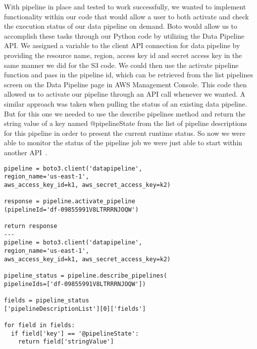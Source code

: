 With pipeline in place and tested to work successfully, we wanted to implement 
functionality within our code that would allow a user to both activate and 
check the execution status of our data pipeline on demand.  Boto would allow 
us to accomplish these tasks through our Python code by utilizing the Data 
Pipeline API. We assigned a variable to the client API connection for data 
pipeline by providing the resource name, region, access key id and secret 
access key in the same manner we did for the S3 code. We could then use the 
activate pipeline function and pass in the pipeline id, which can be retrieved 
from the list pipelines screen on the Data Pipeline page in AWS Management 
Console. This code then allowed us to activate our pipeline through an API 
call whenever we wanted. A similar approach was taken when pulling the status 
of an existing data pipeline. But for this one we needed to use the 
describe pipelines method and return the string value of a key named 
@pipelineState from the list of pipeline descriptions for this pipeline in 
order to present the current runtime status. So now we were able to monitor 
the status of the pipeline job we were just able to start within another 
API~\cite{hid-sp18-521-botodatapipeline}.  

\begin{verbatim}
pipeline = boto3.client('datapipeline',
region_name='us-east-1', 
aws_access_key_id=k1, aws_secret_access_key=k2)

response = pipeline.activate_pipeline
(pipelineId='df-09855991V8LTRRRNJOQW')

return response
---
pipeline = boto3.client('datapipeline',
region_name='us-east-1', 
aws_access_key_id=k1, aws_secret_access_key=k2)

pipeline_status = pipeline.describe_pipelines(
pipelineIds=['df-09855991V8LTRRRNJOQW'])

fields = pipeline_status
['pipelineDescriptionList'][0]['fields']

for field in fields:
  if field['key'] == '@pipelineState':
    return field['stringValue']
\end{verbatim}

